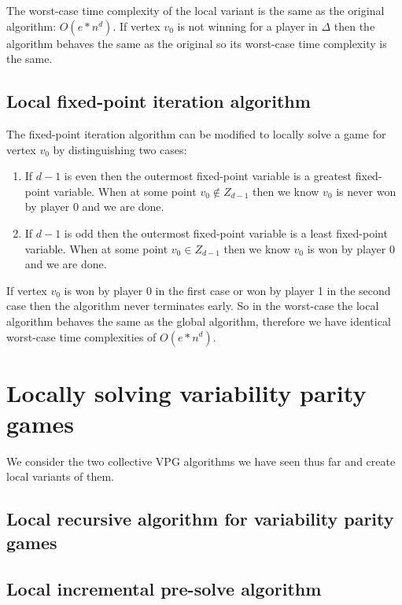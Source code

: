 The worst-case time complexity of the local variant is the same as the original algorithm: $O(e*n^d)$. If vertex $v_0$ is not winning for a player in $\Delta$ then the algorithm behaves the same as the original so its worst-case time complexity is the same.


\subsection{Local fixed-point iteration algorithm}
The fixed-point iteration algorithm can be modified to locally solve a game for vertex $v_0$ by distinguishing two cases:
\begin{enumerate}
	\item If $d-1$ is even then the outermost fixed-point variable is a greatest fixed-point variable. When at some point $v_0 \notin Z_{d-1}$ then we know $v_0$ is never won by player $0$ and we are done.
	\item If $d-1$ is odd then the outermost fixed-point variable is a least fixed-point variable. When at some point $v_0 \in Z_{d-1}$ then we know $v_0$ is won by player $0$ and we are done.
\end{enumerate}

If vertex $v_0$ is won by player 0 in the first case or won by player 1 in the second case then the algorithm never terminates early. So in the worst-case the local algorithm behaves the same as the global algorithm, therefore we have identical worst-case time complexities of $O(e*n^d)$.

\section{Locally solving variability parity games}
We consider the two collective VPG algorithms we have seen thus far and create local variants of them.
\subsection{Local recursive algorithm for variability parity games}


\subsection{Local incremental pre-solve algorithm}

